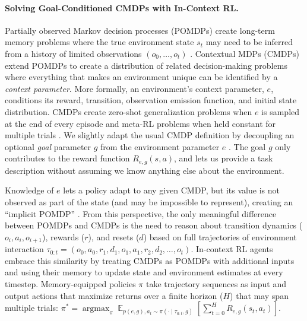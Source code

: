 \paragraph{Solving Goal-Conditioned CMDPs with In-Context RL.} Partially observed Markov decision processes (POMDPs) create long-term memory problems where the true environment state $s_t$ may need to be inferred from a history of limited observations $(o_0, \dots, o_t)$ \cite{cassandra1994acting}. Contextual MDPs (CMDPs) \cite{hallak2015contextual, kirk2022survey, perez2020generalized} extend POMDPs to create a distribution of related decision-making problems where everything that makes an environment unique can be identified by a \textit{context parameter}. More formally, an environment's context parameter, $e$, conditions its reward, transition, observation emission function, and initial state distribution. CMDPs create zero-shot generalization problems when $e$ is sampled at the end of every episode \cite{kirk2022survey} and meta-RL problems when held constant for multiple trials \cite{beck2023survey}. We slightly adapt the usual CMDP definition by decoupling an optional \textit{goal} parameter $g$ from the environment parameter $e$ \cite{liu2021decoupling}. The goal $g$ only contributes to the reward function $R_{e, g}(s, a)$, and lets us provide a task description without assuming we know anything else about the environment.

Knowledge of $e$ lets a policy adapt to any given CMDP, but its value is not observed as part of the state (and may be impossible to represent), creating an ``implicit POMDP'' \cite{ghosh2021generalization, humplik2019meta}. From this perspective, the only meaningful difference between POMDPs and CMDPs is the need to reason about transition dynamics ($o_i, a_i, o_{i+1}$), rewards ($r$), and resets ($d$) based on full trajectories of environment interaction $\tau_{0:t} = (o_0, a_0, r_1, d_1, o_1, a_1, r_2, d_2, \dots, o_t)$. In-context RL agents embrace this similarity by treating CMDPs as POMDPs with additional inputs and using their memory to update state and environment estimates at every timestep. Memory-equipped policies $\pi$ take trajectory sequences as input and output actions that maximize returns over a finite horizon ($H$) that may span multiple trials: $\pi^* = \mathop{\text{argmax}}_{\pi} \mathop{\mathbb{E}}_{p(e, g), a_t \sim \pi(\cdot \mid \tau_{0:t}, g)}\left[\sum_{t=0}^{H}R_{e, g}(s_t, a_t)\right]$.

